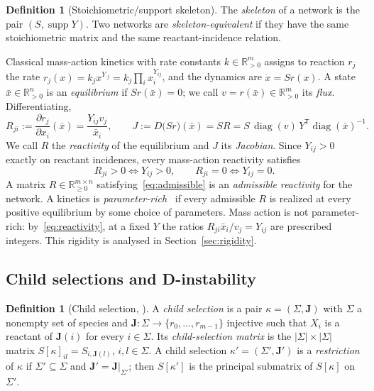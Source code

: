 \documentclass[11pt,a4paper]{article}
\theoremstyle{plain}
\theoremstyle{definition}
\newtheorem{definition}[theorem]{Definition}
\theoremstyle{remark}
\newcommand{\R}{\mathbb{R}}
\newcommand{\diag}{\operatorname{diag}}
\newcommand{\supp}{\operatorname{supp}}
\newcommand{\xbar}{\bar{x}}
\begin{document}
\begin{definition}[Stoichiometric/support skeleton]
The \emph{skeleton} of a network is the pair $(S,\supp Y)$. Two networks are \emph{skeleton-equivalent} if they have the same stoichiometric matrix and the same reactant-incidence relation.
\end{definition}

Classical mass-action kinetics with rate constants $k\in\R_{>0}^m$ assigns to reaction $r_j$ the rate $r_j(x)=k_jx^{Y_{\cdot j}}=k_j\prod_i x_i^{Y_{ij}}$, and the dynamics are $\dot x=Sr(x)$. A state $\xbar\in\R_{>0}^n$ is an \emph{equilibrium} if $Sr(\xbar)=0$; we call $v=r(\xbar)\in\R_{>0}^m$ its \emph{flux}. Differentiating,
\begin{equation}\label{eq:reactivity}
  R_{ji}:=\frac{\partial r_j}{\partial x_i}(\xbar)=\frac{Y_{ij}v_j}{\xbar_i},
  \qquad
  J:=D\bigl(Sr\bigr)(\xbar)=SR=S\,\diag(v)\,Y^{\mathsf T}\diag(\xbar)^{-1}.
\end{equation}
We call $R$ the \emph{reactivity} of the equilibrium and $J$ its \emph{Jacobian}. Since $Y_{ij}>0$ exactly on reactant incidences, every mass-action reactivity satisfies
\begin{equation}\label{eq:admissible}
  R_{ji}>0\iff Y_{ij}>0,\qquad R_{ji}=0\iff Y_{ij}=0 .
\end{equation}
A matrix $R\in\R_{\ge0}^{m\times n}$ satisfying~\eqref{eq:admissible} is an \emph{admissible reactivity} for the network. A kinetics is \emph{parameter-rich}~\cite[Def.~3]{VassenaStadler2024} if every admissible $R$ is realized at every positive equilibrium by some choice of parameters. Mass action is not parameter-rich: by~\eqref{eq:reactivity}, at a fixed $Y$ the ratios $R_{ji}\xbar_i/v_j=Y_{ij}$ are prescribed integers. This rigidity is analysed in Section~\ref{sec:rigidity}.

\subsection{Child selections and D-instability}

\begin{definition}[Child selection, {\cite[Def.~7]{VassenaStadler2024}}]
A \emph{child selection} is a pair $\kappa=(\Sigma,\mathbf{J})$ with $\Sigma$ a nonempty set of species and $\mathbf{J}\colon\Sigma\to\{r_0,\dots,r_{m-1}\}$ injective such that $X_i$ is a reactant of $\mathbf J(i)$ for every $i\in\Sigma$. Its \emph{child-selection matrix} is the $|\Sigma|\times|\Sigma|$ matrix $S[\kappa]_{il}=S_{i,\mathbf J(l)}$, $i,l\in\Sigma$. A child selection $\kappa'=(\Sigma',\mathbf J')$ is a \emph{restriction} of $\kappa$ if $\Sigma'\subseteq\Sigma$ and $\mathbf J'=\mathbf J|_{\Sigma'}$; then $S[\kappa']$ is the principal submatrix of $S[\kappa]$ on $\Sigma'$.
\end{definition}
\end{document}
